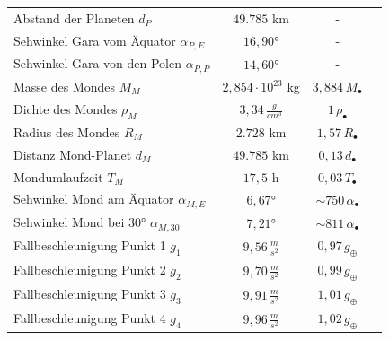 \begin{table}[htb]
\begin{threeparttable}[\linewidth]
\begin{tabular}{l|ccc}
		    Abstand der Planeten $d_P$ & $49.785$ km & -\\
		    Sehwinkel Gara vom Äquator $\alpha_{P,E}$ & $16,90$° & -\\
		    Sehwinkel Gara von den Polen $\alpha_{P,P}$ & $14,60$° & -\\
		    Masse des Mondes $M_M$ & $2,854\cdot 10^{23}$ kg & $3,884\,M_\bullet$\\
		    Dichte des Mondes $\rho_M$ & $3,34\,\frac{g}{cm^3}$ & $1\,\rho_\bullet$\\
		    Radius des Mondes $R_M$ & $2.728$ km & $1,57\,R_\bullet$\\
		    Distanz Mond-Planet $d_M$ & $49.785$ km & $0,13\,d_\bullet$\\
		    Mondumlaufzeit $T_M$ & $17,5$ h & $0,03\,T_\bullet$\\
		    Sehwinkel Mond am Äquator $\alpha_{M,E}$ & $6,67$° & $\sim 750\,\alpha_\bullet$\\
		    Sehwinkel Mond bei $30$° $\alpha_{M,30}$ & $7,21$° & $\sim 811\,\alpha_\bullet$\\
		    Fallbeschleunigung Punkt 1 $g_1$ & $9,56\,\frac{m}{s^2}$ & $0,97\,g_\oplus$\\
		    Fallbeschleunigung Punkt 2 $g_2$ & $9,70\,\frac{m}{s^2}$ & $0,99\,g_\oplus$\\
		    Fallbeschleunigung Punkt 3 $g_3$ & $9,91\,\frac{m}{s^2}$ & $1,01\,g_\oplus$\\
		    Fallbeschleunigung Punkt 4 $g_4$ & $9,96\,\frac{m}{s^2}$ & $1,02\,g_\oplus$
			\bottomrule
		\end{tabular}
	\end{threeparttable}
\end{table}

